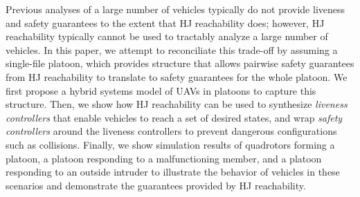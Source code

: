Previous analyses of a large number of vehicles typically do not provide liveness and safety guarantees to the extent that HJ reachability does; however, HJ reachability typically cannot be used to tractably analyze a large number of vehicles. %
In this paper, we attempt to reconciliate this trade-off by assuming a single-file platoon, which provides structure that allows pairwise safety guarantees from HJ reachability to translate to safety guarantees for the whole platoon. We first propose a hybrid systems model of UAVs in platoons to capture this structure. Then, we show how HJ reachability can be used to synthesize \textit{liveness controllers} that enable vehicles to reach a set of desired states, and wrap \textit{safety controllers} around the liveness controllers to prevent dangerous configurations such as collisions. Finally, we show simulation results of quadrotors forming a platoon, a platoon responding to a malfunctioning member, and a platoon responding to an outside intruder to illustrate the behavior of vehicles in these scenarios and demonstrate the guarantees provided by HJ reachability.

%
%
